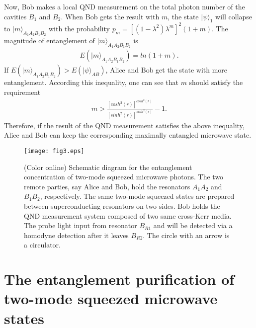 \documentclass[preprintnumbers,showkeys,amsmath,amssymb]{revtex4}%
\begin{document}
Now, Bob makes a local QND measurement on the total photon number of
the cavities $B_{1}$ and $B_{2}$. When Bob gets the result with $m$,
the state $|\psi\rangle_{1}$ will collapse to
$|m\rangle_{\!A_{1}\!A_{2}\!B_{1}\!B_{2}}$ with the  probability
$p_{m}=[(1-\lambda^{2})\lambda^{m}]^{2}(1+m)$. The magnitude of
entanglement of $|m\rangle_{\!A_{1}\!A_{2}\!B_{1}\!B_{2}}$ is
\begin{eqnarray}    \label{}
E(|m\rangle_{\!A_{1}\!A_{2}\!B_{1}\!B_{2}})=ln(1+m).
\end{eqnarray}
If
$E(|m\rangle_{\!A_{1}\!A_{2}\!B_{1}\!B_{2}})>E(|\psi\rangle_{AB})$,
Alice and Bob get the state with more entanglement. According this
inequality, one can see that $m$ should satisfy the requirement
\begin{eqnarray}    \label{}
m>\frac{[cosh^{2}(r)]^{cosh^{2}(r)}}{[sinh^{2}(r)]^{sinh^{2}(r)}}-1.
\end{eqnarray}
Therefore, if the result of the QND measurement satisfies the above
inequality, Alice and Bob can keep the corresponding maximally
 entangled microwave state.

\begin{figure}[!ht]%
\centering\texttt{[image: fig3.eps]}
\caption{(Color online) Schematic diagram for the entanglement concentration of
two-mode squeezed microwave photons. The two remote parties, say
Alice and Bob, hold the resonators $A_{1}A_{2}$ and $B_{1}B_{2}$,
respectively. The same two-mode squeezed states are prepared between
superconducting resonators on two sides. Bob holds the QND
measurement system composed of two same cross-Kerr media. The probe
light input from resonator $B_{R1}$ and will be detected via a
homodyne detection after it leaves $B_{R2}$. The circle with an arrow
is a circulator.} \label{concentration}
\end{figure}




\section{The entanglement purification of two-mode squeezed microwave states} \label{sec4}
\end{document}
